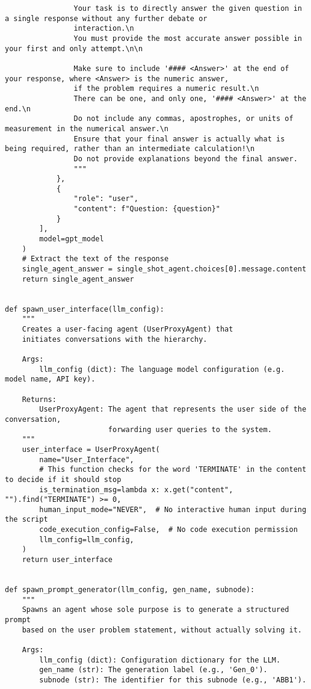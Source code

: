 \begin{lstlisting}
                Your task is to directly answer the given question in a single response without any further debate or 
                interaction.\n
                You must provide the most accurate answer possible in your first and only attempt.\n\n

                Make sure to include '#### <Answer>' at the end of your response, where <Answer> is the numeric answer, 
                if the problem requires a numeric result.\n
                There can be one, and only one, '#### <Answer>' at the end.\n
                Do not include any commas, apostrophes, or units of measurement in the numerical answer.\n
                Ensure that your final answer is actually what is being required, rather than an intermediate calculation!\n
                Do not provide explanations beyond the final answer.
                """
            },
            {
                "role": "user",
                "content": f"Question: {question}"
            }
        ],
        model=gpt_model
    )
    # Extract the text of the response
    single_agent_answer = single_shot_agent.choices[0].message.content
    return single_agent_answer


def spawn_user_interface(llm_config):
    """
    Creates a user-facing agent (UserProxyAgent) that
    initiates conversations with the hierarchy.

    Args:
        llm_config (dict): The language model configuration (e.g. model name, API key).

    Returns:
        UserProxyAgent: The agent that represents the user side of the conversation,
                        forwarding user queries to the system.
    """
    user_interface = UserProxyAgent(
        name="User_Interface",
        # This function checks for the word 'TERMINATE' in the content to decide if it should stop
        is_termination_msg=lambda x: x.get("content", "").find("TERMINATE") >= 0,
        human_input_mode="NEVER",  # No interactive human input during the script
        code_execution_config=False,  # No code execution permission
        llm_config=llm_config,
    )
    return user_interface


def spawn_prompt_generator(llm_config, gen_name, subnode):
    """
    Spawns an agent whose sole purpose is to generate a structured prompt
    based on the user problem statement, without actually solving it.

    Args:
        llm_config (dict): Configuration dictionary for the LLM.
        gen_name (str): The generation label (e.g., 'Gen_0').
        subnode (str): The identifier for this subnode (e.g., 'ABB1').


\end{lstlisting}
